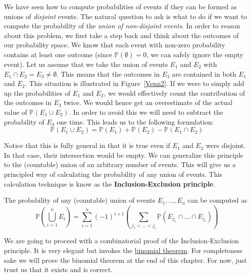 We have seen how to compute probabilities of events if they can be formed as unions of \textit{disjoint}
events. The natural question to ask is what to do if we want to compute the probability of the \emph{union
of non-disjoint events}. In order to reason about this problem, we first take a step back and think about the
outcomes of our probability space. We know that each event with non-zero probability contains at least one outcome (since
$ \mathbb{P}(\emptyset) = 0 $, we can safely ignore the empty event). Let us assume that we take the union of events
$ E_{1} $ and $ E_{2} $ with $ E_{1} \cap E_{2} = E_{3} \not = \emptyset $. This means that the outcomes
in $ E_{3} $ are contained in both $ E_{1} $ and $ E_{2} $. This situation is illustrated in Figure~\ref{Venn2}. If we were to simply add up the probabilities of $ E_{1} $ and $ E_{2} $, we 
would effectively count the contribution of the outcomes in $ E_{3} $ twice. We would hence
get an overestimate of the actual value of $ \mathbb{P}(E_{1} \cup E_{2}) $.
In order to avoid this we will need to subtract the probability of $ E_{3} $ one time. This leads us to the following formulation:
\begin{equation}
\mathbb{P}(E_{1} \cup E_{2}) = \mathbb{P}(E_{1}) + \mathbb{P}(E_{2}) - \mathbb{P}(E_{1} \cap E_{2})
\end{equation}

Notice that this is fully general in that it is true even if $ E_{1} $ and $ E_{2} $ were disjoint. In that
case, their intersection would be empty. We can generalize this principle to the (countable) union of
an arbitrary number of events. This will give us a principled way of calculating the probability of any
union of events. This calculation technique is know as the \textbf{Inclusion-Exclusion principle}.

\newpage
\begin{Theorem}
The probability of any (countable) union of events $ E_{1}, \ldots, E_{n} $ can be computed as
\begin{equation}\label{eq:incexc}
\mathbb{P} \left( \underset{i=1}{\overset{n}{\bigcup}} E_{i} \right) 
= \underset{i=1}{\overset{n}{\sum}} (-1)^{i+1} \left( \underset{j_{1}<\ldots<j_{i}}{\sum} 
\mathbb{P} \left(E_{j_{1}} \cap \ldots \cap E_{j_{i}} \right) \right)
\end{equation}
\end{Theorem}

We are going to proceed with a combinatorial proof of the Inclusion-Exclusion principle. It is
very elegant but invokes the \href{https://en.wikipedia.org/wiki/Binomial_theorem}{binomial theorem}.
For completeness sake we will prove the binomial theorem
at the end of this chapter. For now, just trust us that it exists and is correct.

